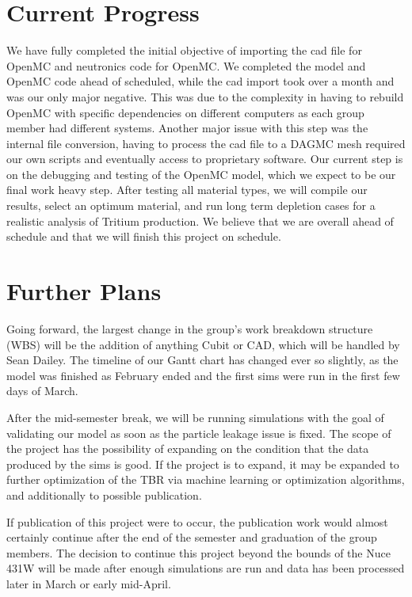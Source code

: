 \documentclass[runningheads]{llncs}
\begin{document}
\section{Current Progress}
\hspace{0.5cm} 

We have fully completed the initial objective of importing the cad file for OpenMC and neutronics code for OpenMC. We completed the model and OpenMC code ahead of scheduled, while the cad import took over a month and was our only major negative. This was due to the complexity in having to rebuild OpenMC with specific dependencies on different computers as each group member had different systems. Another major issue with this step was the internal file conversion, having to process the cad file to a DAGMC mesh required our own scripts and eventually access to proprietary software. Our current step is on the debugging and testing of the OpenMC model, which we expect to be our final work heavy step. After testing all material types, we will compile our results, select an optimum material, and run long term depletion cases for a realistic analysis of Tritium production. We believe that we are overall ahead of schedule and that we will finish this project on schedule. \cite{group}

\section{Further Plans}

Going forward, the largest change in the group's work breakdown structure (WBS) will be the addition of anything Cubit or CAD, which will be handled by Sean Dailey. 
The timeline of our Gantt chart has changed ever so slightly, as the model was finished as February ended and the first sims were run in the first few days of March. 

After the mid-semester break, we will be running simulations with the goal of validating our model as soon as the particle leakage issue is fixed.
The scope of the project has the possibility of expanding on the condition that the data produced by the sims is good. If the project is to expand, it may be expanded to further optimization of the TBR via machine learning or optimization algorithms, and additionally to possible publication.

If publication of this project were to occur, the publication work would almost certainly continue after the end of the semester and graduation of the group members. The decision to continue this project beyond the bounds of the Nuce 431W will be made after enough simulations are run and data has been processed later in March or early mid-April.


%
%




%
%
%



%
\end{document}
